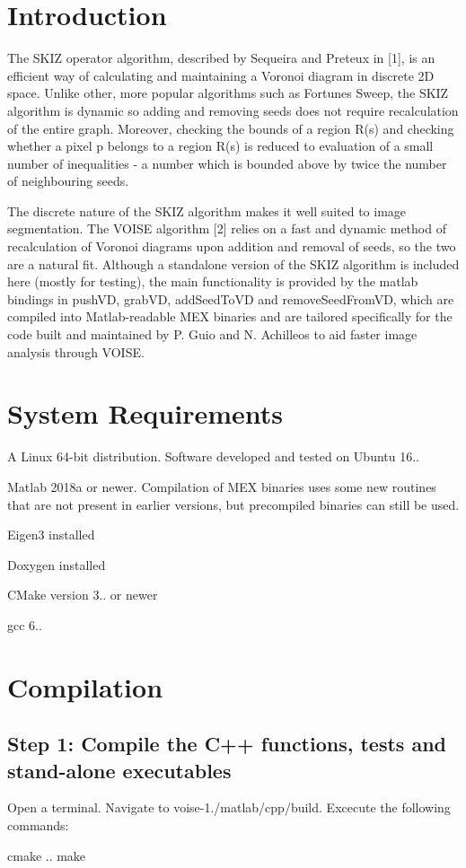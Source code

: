 \hypertarget{index_intro_sec}{}\section{Introduction}\label{index_intro_sec}
The S\+K\+IZ operator algorithm, described by Sequeira and Preteux in \mbox{[}1\mbox{]}, is an efficient way of calculating and maintaining a Voronoi diagram in discrete 2D space. Unlike other, more popular algorithms such as Fortune\textquotesingle{}s Sweep, the S\+K\+IZ algorithm is dynamic so adding and removing seeds does not require recalculation of the entire graph. Moreover, checking the bounds of a region R(s) and checking whether a pixel p belongs to a region R(s) is reduced to evaluation of a small number of inequalities -\/ a number which is bounded above by twice the number of neighbouring seeds.

The discrete nature of the S\+K\+IZ algorithm makes it well suited to image segmentation. The V\+O\+I\+SE algorithm \mbox{[}2\mbox{]} relies on a fast and dynamic method of recalculation of Voronoi diagrams upon addition and removal of seeds, so the two are a natural fit. Although a standalone version of the S\+K\+IZ algorithm is included here (mostly for testing), the main functionality is provided by the matlab bindings in push\+VD, grab\+VD, add\+Seed\+To\+VD and remove\+Seed\+From\+VD, which are compiled into Matlab-\/readable M\+EX binaries and are tailored specifically for the code built and maintained by P. Guio and N. Achilleos to aid faster image analysis through V\+O\+I\+SE.\hypertarget{index_req_sec}{}\section{System Requirements}\label{index_req_sec}

\begin{DoxyItemize}
\item A Linux 64-\/bit distribution. Software developed and tested on Ubuntu 16..
\item Matlab 2018a or newer. Compilation of M\+EX binaries uses some new routines that are not present in earlier versions, but precompiled binaries can still be used.
\item Eigen3 installed
\item Doxygen installed
\item C\+Make version 3.. or newer
\item gcc 6..
\end{DoxyItemize}\hypertarget{index_install_sec}{}\section{Compilation}\label{index_install_sec}
\hypertarget{index_step1}{}\subsection{Step 1\+: Compile the C++ functions, tests and stand-\/alone executables}\label{index_step1}
Open a terminal. Navigate to {\ttfamily voise-\/1./matlab/cpp/build}. Excecute the following commands\+: \begin{DoxyVerb}    cmake ..
    make
\end{DoxyVerb}


